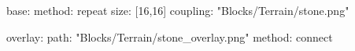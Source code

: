 base:
  method: repeat
  size: [16,16]
  coupling: "Blocks/Terrain/stone.png"

overlay:
  path: "Blocks/Terrain/stone_overlay.png"
  method: connect
